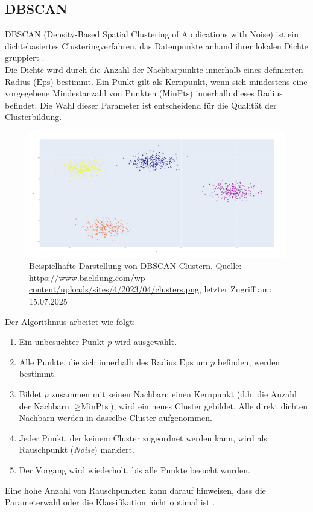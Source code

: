 \documentclass[a4paper,12pt]{article}
\begin{document}
	\subsection{DBSCAN}
	DBSCAN (Density-Based Spatial Clustering of Applications with Noise) ist ein dichtebasiertes Clusteringverfahren, das Datenpunkte anhand ihrer lokalen Dichte gruppiert \cite{ester1996dbscan}.
	\\[0.5em]
	Die Dichte wird durch die Anzahl der Nachbarpunkte innerhalb eines definierten Radius (\( \text{Eps} \)) bestimmt. Ein Punkt gilt als Kernpunkt, wenn sich mindestens eine vorgegebene Mindestanzahl von Punkten (\( \text{MinPts} \)) innerhalb dieses Radius befindet. Die Wahl dieser Parameter ist entscheidend für die Qualität der Clusterbildung.
	\\[0.5em]
	\begin{figure}[H]
		\centering
		\includegraphics[width=0.9\linewidth]{Bilder/screenshot015}
		\caption{Beispielhafte Darstellung von DBSCAN-Clustern. Quelle: \url{https://www.baeldung.com/wp-content/uploads/sites/4/2023/04/clusters.png}, letzter Zugriff am: 15.07.2025}
		\label{fig:screenshot015}
	\end{figure}
	Der Algorithmus arbeitet wie folgt:  
	\begin{enumerate}
		\item Ein unbesuchter Punkt \(p\) wird ausgewählt.
		\item Alle Punkte, die sich innerhalb des Radius \(\text{Eps}\) um \(p\) befinden, werden bestimmt.
		\item Bildet \(p\) zusammen mit seinen Nachbarn einen Kernpunkt (d.h. die Anzahl der Nachbarn \(\geq \text{MinPts}\)), wird ein neues Cluster gebildet. Alle direkt dichten Nachbarn werden in dasselbe Cluster aufgenommen.
		\item Jeder Punkt, der keinem Cluster zugeordnet werden kann, wird als Rauschpunkt (\textit{Noise}) markiert.
		\item Der Vorgang wird wiederholt, bis alle Punkte besucht wurden.
	\end{enumerate}
	Eine hohe Anzahl von Rauschpunkten kann darauf hinweisen, dass die Parameterwahl oder die Klassifikation nicht optimal ist \cite{ester1996dbscan}.
	
\end{document}
